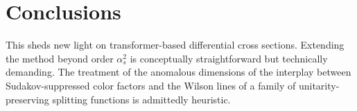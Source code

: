 \section{Conclusions}\label{sec:conclusions}

This sheds new light on transformer-based differential cross sections.
Extending the method beyond order $\alpha_s^2$ is conceptually
straightforward but technically demanding. The treatment of the
anomalous dimensions of the interplay between Sudakov-suppressed color
factors and the Wilson lines of a family of unitarity-preserving
splitting functions is admittedly heuristic.

